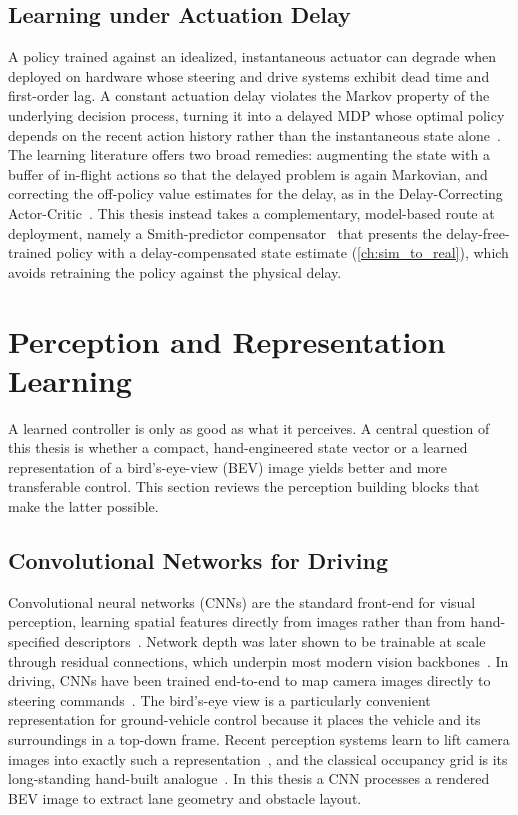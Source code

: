 \subsection{Learning under Actuation Delay}
A policy trained against an idealized, instantaneous actuator can degrade when deployed on hardware whose steering and drive systems exhibit dead time and first-order lag. A constant actuation delay violates the Markov property of the underlying decision process, turning it into a delayed MDP whose optimal policy depends on the recent action history rather than the instantaneous state alone~\cite{walsh2009delayed}. The learning literature offers two broad remedies: augmenting the state with a buffer of in-flight actions so that the delayed problem is again Markovian, and correcting the off-policy value estimates for the delay, as in the Delay-Correcting Actor-Critic~\cite{bouteiller2021delays}. This thesis instead takes a complementary, model-based route at deployment, namely a Smith-predictor compensator~\cite{smith1957closer} that presents the delay-free-trained policy with a delay-compensated state estimate (\cref{ch:sim_to_real}), which avoids retraining the policy against the physical delay.

\section{Perception and Representation Learning}

A learned controller is only as good as what it perceives. A central question of this thesis is whether a compact, hand-engineered state vector or a learned representation of a bird's-eye-view (BEV) image yields better and more transferable control. This section reviews the perception building blocks that make the latter possible.

\subsection{Convolutional Networks for Driving}
Convolutional neural networks (CNNs) are the standard front-end for visual perception, learning spatial features directly from images rather than from hand-specified descriptors~\cite{lecun1998gradient, krizhevsky2012alexnet}. Network depth was later shown to be trainable at scale through residual connections, which underpin most modern vision backbones~\cite{he2016resnet}. In driving, CNNs have been trained end-to-end to map camera images directly to steering commands~\cite{bojarski2016end}. The bird's-eye view is a particularly convenient representation for ground-vehicle control because it places the vehicle and its surroundings in a top-down frame. Recent perception systems learn to lift camera images into exactly such a representation~\cite{philion2020lss}, and the classical occupancy grid is its long-standing hand-built analogue~\cite{elfes1989occupancy}. In this thesis a CNN processes a rendered BEV image to extract lane geometry and obstacle layout.

